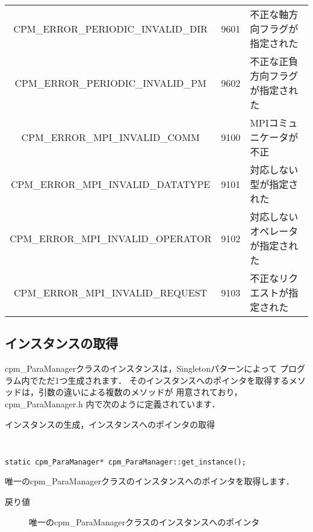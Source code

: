 \begin{itemize}
\begin{table}[htb]
\begin{center}
\begin{tabular}{|c|c|l|}
CPM\_ERROR\_PERIODIC\_INVALID\_DIR  & 9601 & 不正な軸方向フラグが指定された\\
CPM\_ERROR\_PERIODIC\_INVALID\_PM   & 9602 & 不正な正負方向フラグが指定された\\
CPM\_ERROR\_MPI\_INVALID\_COMM      & 9100 & MPIコミュニケータが不正\\
CPM\_ERROR\_MPI\_INVALID\_DATATYPE  & 9101 & 対応しない型が指定された\\
CPM\_ERROR\_MPI\_INVALID\_OPERATOR  & 9102 & 対応しないオペレータが指定された\\
CPM\_ERROR\_MPI\_INVALID\_REQUEST   & 9103 & 不正なリクエストが指定された\\
\hline
\end{tabular}
\end{center}
\end{table}
\end{itemize}


\clearpage


\subsection{インスタンスの取得}
\label{CPMinstance}

cpm\_ParaManagerクラスのインスタンスは，Singletonパターンによって
プログラム内でただ1つ生成されます．
そのインスタンスへのポインタを取得するメソッドは，引数の違いによる複数のメソッドが
用意されており，cpm\_ParaManager.h 内で次のように定義されています．\\

\begin{spacing}{0.8}
\begin{itembox}[l]{インスタンスの生成，インスタンスへのポインタの取得}
{\tt
\begin{verbatim}
static cpm_ParaManager* cpm_ParaManager::get_instance(); 
\end{verbatim}
}
唯一のcpm\_ParaManagerクラスのインスタンスへのポインタを取得します．
\begin{description}
\item[戻り値] 唯一のcpm\_ParaManagerクラスのインスタンスへのポインタ
\end{description}
\end{itembox}\\
\end{spacing}

